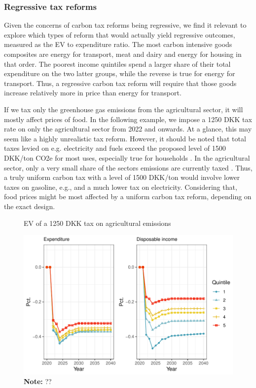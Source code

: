 \subsubsection{Regressive tax reforms}\label{sec:regressivetaxref}
Given the concerns of carbon tax reforms being regressive, we find it relevant to explore which types of reform that would actually yield regressive outcomes, measured as the EV to expenditure ratio. The most carbon intensive goods composites are energy for transport, meat and dairy and energy for housing in that order. The poorest income quintiles spend a larger share of their total expenditure on the two latter groups, while the reverse is true for energy for transport. Thus, a regressive carbon tax reform will require that those goods increase relatively more in price than energy for transport.

If we tax only the greenhouse gas emissions from the agricultural sector, it will mostly affect prices of food. In the following example, we impose a 1250 DKK tax rate on only the agricultural sector from 2022 and onwards. At a glance, this may seem like a highly unrealistic tax reform. However, it should be noted that total taxes levied on e.g. electricity and fuels exceed the proposed level of 1500 DKK/ton CO2e for most uses, especially true for households \citep{dmoer2021} . In the agricultural sector, only a very small share of the sectors emissions are currently taxed \citep{klimaraad2021}. Thus, a truly uniform carbon tax with a level of 1500 DKK/ton would involve lower taxes on gasoline, e.g., and a much lower tax on electricity. Considering that, food prices might be most affected by a uniform carbon tax reform, depending on the exact design.



\begin{figure}[H]
\centering
\caption{EV of a 1250 DKK tax on agricultural emissions}
\label{figagriculturetax}
\includegraphics[width=.7\textwidth]{Figures/IO-resultater/landbrugev.pdf}
\captionsetup{singlelinecheck=off,size=scriptsize}
\setlength{\captionmargin}{10pt}
\caption*{
\textbf{Note:} ??\\}
\end{figure}

